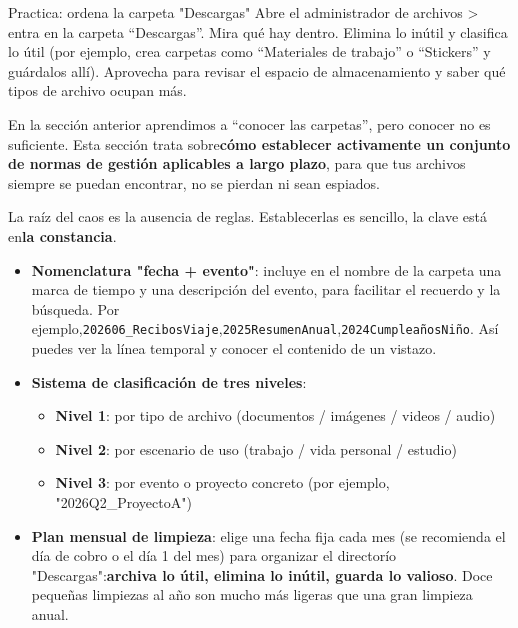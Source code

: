 \begin{tcbpractice}{Practica: ordena la carpeta "Descargas"}
Abre el administrador de archivos > entra en la carpeta “Descargas”. Mira qué hay dentro. Elimina lo inútil y clasifica lo útil (por ejemplo, crea carpetas como “Materiales de trabajo” o “Stickers” y guárdalos allí). Aprovecha para revisar el espacio de almacenamiento y saber qué tipos de archivo ocupan más.

\end{tcbpractice}


En la sección anterior aprendimos a “conocer las carpetas”, pero conocer no es suficiente. Esta sección trata sobre\textbf{cómo establecer activamente un conjunto de normas de gestión aplicables a largo plazo}, para que tus archivos siempre se puedan encontrar, no se pierdan ni sean espiados.


La raíz del caos es la ausencia de reglas. Establecerlas es sencillo, la clave está en\textbf{la constancia}.

\begin{itemize}
  \item \textbf{Nomenclatura "fecha + evento"}: incluye en el nombre de la carpeta una marca de tiempo y una descripción del evento, para facilitar el recuerdo y la búsqueda. Por ejemplo,\texttt{202606\_RecibosViaje},\texttt{2025ResumenAnual},\texttt{2024CumpleañosNiño}. Así puedes ver la línea temporal y conocer el contenido de un vistazo.
  \item \textbf{Sistema de clasificación de tres niveles}:
  \begin{itemize}
    \item \textbf{Nivel 1}: por tipo de archivo (documentos / imágenes / videos / audio)
    \item \textbf{Nivel 2}: por escenario de uso (trabajo / vida personal / estudio)
    \item \textbf{Nivel 3}: por evento o proyecto concreto (por ejemplo, "2026Q2\_ProyectoA")
  \end{itemize}
  \item \textbf{Plan mensual de limpieza}: elige una fecha fija cada mes (se recomienda el día de cobro o el día 1 del mes) para organizar el directorío "Descargas":\textbf{archiva lo útil, elimina lo inútil, guarda lo valioso}. Doce pequeñas limpiezas al año son mucho más ligeras que una gran limpieza anual.
\end{itemize}

